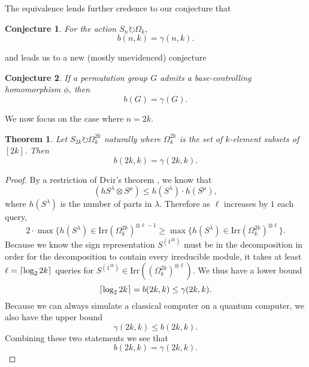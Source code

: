 \documentclass[12pt,twoside]{reedthesis}
\theoremstyle{plain}   %
\newtheorem{thm}{Theorem}[section] %
\newtheorem{conj}{Conjecture}[section]
\theoremstyle{definition}
\theoremstyle{remark}
\numberwithin{equation}{section}
\def\irr{\mathrm{Irr}}
\def\acts{\circlearrowright} %
\DeclarePairedDelimiter\ceil{\lceil}{\rceil}
\begin{document}
The equivalence lends further credence to our conjecture that
\begin{conj}
  For the action $S_n \acts \Omega_k$,
  \[ b(n,k) = \gamma(n,k).\]
\end{conj}
and leads us to a new (mostly unevidenced) conjecture
\begin{conj}
  If a permutation group $G$ admits a base-controlling homomorphism $\phi$, then
  \[ b(G) = \gamma(G).\]
\end{conj}
We now focus on the case where $n = 2k$.
\begin{thm}
  Let $S_{2k} \acts \Omega^{2k}_k$ naturally where $\Omega^{2k}_k$ is the set of $k$-element subsets of $[2k]$. Then
  \[b(2k,k) = \gamma(2k,k).\]
\end{thm}
\begin{proof}
  By a restriction of Dvir's theorem , we know that
  \[ (h S^\lambda \otimes S^\mu) \leq h( S^\lambda) \cdot h (S^\mu),\]
  where $h(S^\lambda)$ is the number of parts in $\lambda$.
  Therefore as $\ell$ increases by $1$ each query,
  \[ 2 \cdot \max\{ h(S^\lambda) \in \irr ( \Omega^{2k}_k)^{\otimes \ell -1} \geq \max\{ h(S^\lambda) \in \irr ( \Omega^{2k}_k)^{\otimes \ell} \}.\]
  Because we know the sign representation $S^{(1^{2k})}$ must be in the decomposition in order for the decomposition to contain every irreducible module, it takes at least
  $\ell = \ceil*{ \log_2 2k }$ queries for $S^{(1^{2k})} \in \irr(( \Omega^{2k}_k)^{\otimes \ell})$.
  We thus have a lower bound
  \[\ceil*{ \log_2 2k } = b(2k,k) \leq \gamma(2k,k).\]
  Because we can always simulate a classical computer on a quantum computer, we also have the upper bound
  \[\gamma(2k,k) \leq b(2k,k).\]
  Combining these two statements we see that
  \[ b(2k,k) = \gamma(2k,k).\]
\end{proof}
\end{document}
